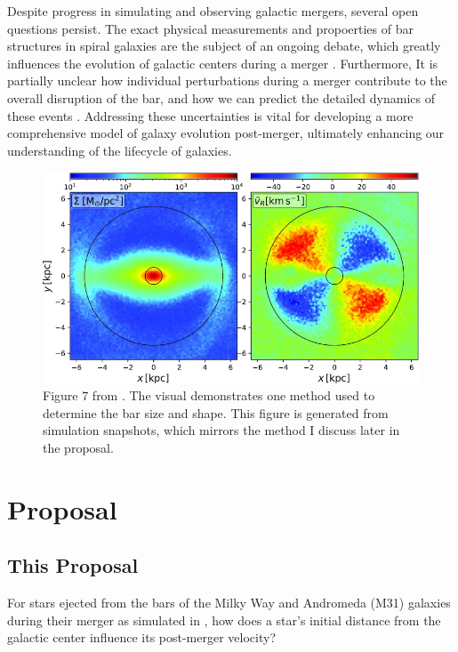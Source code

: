 \documentclass[twocolumn]{aastex631}
\begin{document}
Despite progress in simulating and observing galactic mergers, several
open questions persist. The exact physical measurements and
propoerties of bar structures in spiral galaxies are the subject of an
ongoing debate, which greatly influences the evolution of galactic
centers during a merger \citep{rathore:25}. Furthermore, It is partially unclear
how individual perturbations during a merger contribute to the overall
disruption of the bar, and how we can predict the detailed dynamics of
these events \citep{berentzen:03}. Addressing these uncertainties is vital for
developing a more comprehensive model of galaxy evolution post-merger,
ultimately enhancing our understanding of the lifecycle of galaxies.

\begin{figure}[htbp]
  \includegraphics[width=1.0\textwidth]{dehnen23.jpeg}
  \caption{Figure 7 from \citet{dehnen:23}. The visual demonstrates
    one method used to determine the bar size and shape. This figure
    is generated from simulation snapshots, which mirrors the method I
    discuss later in the proposal.}
  \label{fig:dehnen}
\end{figure}

\section{Proposal}

\subsection{This Proposal}
For stars ejected from the bars of the Milky Way and Andromeda (M31)
galaxies during their merger as simulated in \citet{vandermarel:12},
how does a star's initial distance from the galactic center influence
its post-merger velocity?
\end{document}

